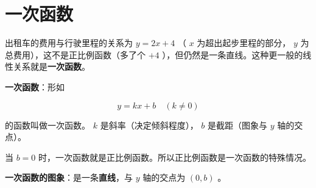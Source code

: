 \section*{一次函数}


\begin{explore}


出租车的费用与行驶里程的关系为 $y = 2x + 4$ （ $x$ 为超出起步里程的部分， $y$ 为总费用），这不是正比例函数（多了个 $+4$ ），但仍然是一条直线。这种更一般的线性关系就是\textbf{一次函数}。

\end{explore}

\begin{understand}


\textbf{一次函数}：形如

\[
y = kx + b \quad (k \neq 0)
\]


的函数叫做一次函数。 $k$ 是斜率（决定倾斜程度）， $b$ 是截距（图象与 $y$ 轴的交点）。

当 $b = 0$ 时，一次函数就是正比例函数。所以正比例函数是一次函数的特殊情况。

\textbf{一次函数的图象}：是一条\textbf{直线}，与 $y$ 轴的交点为 $(0, b)$ 。

\end{understand}

